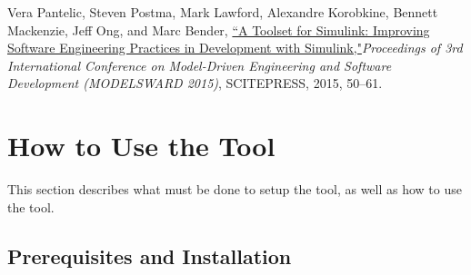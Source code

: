 \documentclass{article}
\begin{document}
\vspace{1em}
Vera Pantelic, Steven Postma, Mark Lawford, Alexandre Korobkine, Bennett Mackenzie, Jeff Ong, and Marc Bender, \href{http://www.cas.mcmaster.ca/~lawford/papers/MODELSWARD2015.pdf}{``A Toolset for Simulink: Improving Software Engineering Practices in Development with Simulink,"}\textit{Proceedings of 3rd International Conference on Model-Driven Engineering and Software Development (MODELSWARD 2015)}, SCITEPRESS, 2015, 50--61.

\newpage	
\section{How to Use the Tool}
This section describes what must be done to setup the tool, as well as how to use the tool.

\subsection{Prerequisites and Installation}
\end{document}
